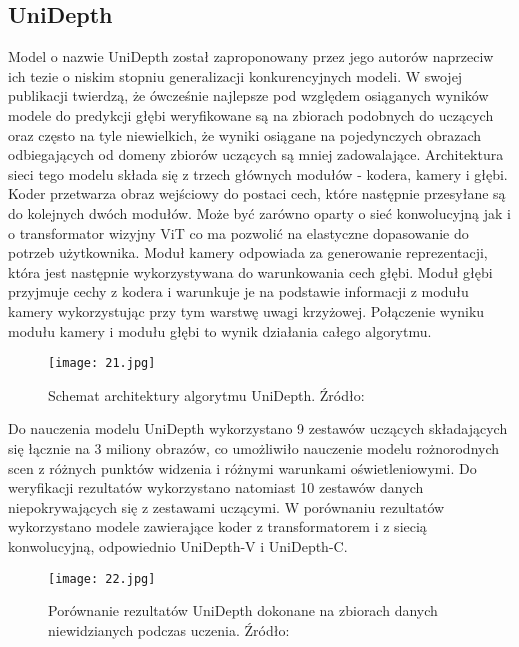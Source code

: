 \subsection{UniDepth}
Model o nazwie UniDepth \cite{piccinelli2024} został zaproponowany przez jego autorów naprzeciw ich tezie o niskim stopniu generalizacji konkurencyjnych modeli. W swojej publikacji twierdzą, że ówcześnie najlepsze pod względem osiąganych wyników modele do predykcji głębi weryfikowane są na zbiorach podobnych do uczących oraz często na tyle niewielkich, że wyniki osiągane na pojedynczych obrazach odbiegających od domeny zbiorów uczących są mniej zadowalające.
Architektura sieci tego modelu składa się z trzech głównych modułów - kodera, kamery i głębi. Koder przetwarza obraz wejściowy do postaci cech, które następnie przesyłane są do kolejnych dwóch modułów. Może być zarówno oparty o sieć konwolucyjną jak i o transformator wizyjny ViT co ma pozwolić na elastyczne dopasowanie do potrzeb użytkownika. Moduł kamery odpowiada za generowanie reprezentacji, która jest następnie wykorzystywana do warunkowania cech głębi. Moduł głębi przyjmuje cechy z kodera i warunkuje je na podstawie informacji z modułu kamery wykorzystując przy tym warstwę uwagi krzyżowej. Połączenie wyniku modułu kamery i modułu głębi to wynik działania całego algorytmu.
\begin{figure}[H]
    \centering
    \texttt{[image: 21.jpg]}
    \caption{Schemat architektury algorytmu UniDepth. Źródło: \cite{piccinelli2024}}
    \label{fig:unidepth-schema}
\end{figure}
Do nauczenia modelu UniDepth wykorzystano 9 zestawów uczących składających się łącznie na 3 miliony obrazów, co umożliwiło nauczenie modelu rożnorodnych scen z różnych punktów widzenia i różnymi warunkami oświetleniowymi. Do weryfikacji rezultatów wykorzystano natomiast 10 zestawów danych niepokrywających się z zestawami uczącymi. W porównaniu rezultatów wykorzystano modele zawierające koder z transformatorem i z siecią konwolucyjną, odpowiednio UniDepth-V i UniDepth-C.
\begin{figure}[H]
    \centering
    \texttt{[image: 22.jpg]}
    \caption{Porównanie rezultatów UniDepth dokonane na zbiorach danych niewidzianych podczas uczenia. Źródło: \cite{piccinelli2024}}
    \label{fig:unidepth-results}
\end{figure}


